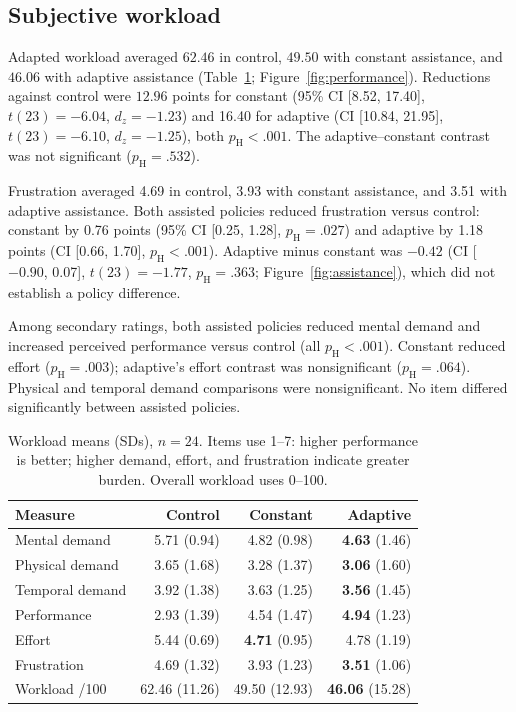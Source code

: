 \documentclass[sigconf,anonymous]{aamas}
\begin{document}
\subsection{Subjective workload}
Adapted workload averaged $62.46$ in control, $49.50$ with constant assistance, and $46.06$ with adaptive assistance (Table~\ref{tab:workload}; Figure~\ref{fig:performance}). Reductions against control were $12.96$ points for constant (95\% CI [8.52, 17.40], $t(23)=-6.04$, $d_z=-1.23$) and 16.40 for adaptive (CI [10.84, 21.95], $t(23)=-6.10$, $d_z=-1.25$), both $p_{\mathrm{H}}<.001$. The adaptive--constant contrast was not significant ($p_{\mathrm{H}}=.532$).

Frustration averaged 4.69 in control, 3.93 with constant assistance, and 3.51 with adaptive assistance. Both assisted policies reduced frustration versus control: constant by 0.76 points (95\% CI [0.25, 1.28], $p_{\mathrm{H}}=.027$) and adaptive by 1.18 points (CI [0.66, 1.70], $p_{\mathrm{H}}<.001$). Adaptive minus constant was $-0.42$ (CI [$-0.90$, 0.07], $t(23)=-1.77$, $p_{\mathrm{H}}=.363$; Figure~\ref{fig:assistance}), which did not establish a policy difference.

Among secondary ratings, both assisted policies reduced mental demand and increased perceived performance versus control (all $p_{\mathrm{H}}<.001$). Constant reduced effort ($p_{\mathrm{H}}=.003$); adaptive's effort contrast was nonsignificant ($p_{\mathrm{H}}=.064$). Physical and temporal demand comparisons were nonsignificant. No item differed significantly between assisted policies.

\begin{table}[h]
\centering
\caption{Workload means (SDs), $n=24$. Items use 1--7: higher performance is better; higher demand, effort, and frustration indicate greater burden. Overall workload uses 0--100.}
\label{tab:workload}
\setlength{\tabcolsep}{3pt}
\begin{tabular}{lrrr}
\toprule
Measure & Control & Constant & Adaptive \\
\midrule
Mental demand & 5.71 (0.94) & 4.82 (0.98) & \textbf{4.63} (1.46) \\
Physical demand & 3.65 (1.68) & 3.28 (1.37) & \textbf{3.06} (1.60) \\
Temporal demand & 3.92 (1.38) & 3.63 (1.25) & \textbf{3.56} (1.45) \\
Performance & 2.93 (1.39) & 4.54 (1.47) & \textbf{4.94} (1.23) \\
Effort & 5.44 (0.69) & \textbf{4.71} (0.95) & 4.78 (1.19) \\
Frustration & 4.69 (1.32) & 3.93 (1.23) & \textbf{3.51} (1.06) \\
Workload /100 & 62.46 (11.26) & 49.50 (12.93) & \textbf{46.06} (15.28) \\
\bottomrule
\end{tabular}
\end{table}
\end{document}
